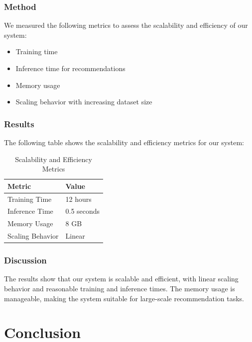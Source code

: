 \documentclass{article}
\begin{document}
\subsubsection{Method}
We measured the following metrics to assess the scalability and efficiency of
our system:

\begin{itemize}
      \item Training time
      \item Inference time for recommendations
      \item Memory usage
      \item Scaling behavior with increasing dataset size
      
\end{itemize}

\subsubsection{Results}
The following table shows the scalability and efficiency metrics for our
system:

\begin{table}[H]
      \centering
      \begin{tabular}{|l|l|}
            \hline
            \textbf{Metric}         & \textbf{Value} \\ \hline
            Training Time           & 12 hours      \\
            Inference Time          & 0.5 seconds   \\
            Memory Usage            & 8 GB          \\
            Scaling Behavior        & Linear        \\ \hline
      \end{tabular}
      \caption{Scalability and Efficiency Metrics}
      \label{tab:results}
\end{table}

\subsubsection{Discussion}
The results show that our system is scalable and efficient, with linear scaling
behavior and reasonable training and inference times. The memory usage is
manageable, making the system suitable for large-scale recommendation tasks.

\section{Conclusion}
\end{document}
